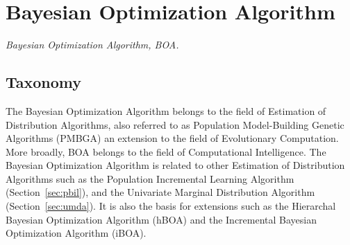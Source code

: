 

\section{Bayesian Optimization Algorithm} 
\label{sec:boa}

\emph{Bayesian Optimization Algorithm, BOA.}

\subsection{Taxonomy}
The Bayesian Optimization Algorithm belongs to the field of Estimation of Distribution Algorithms, also referred to as Population Model-Building Genetic Algorithms (PMBGA) an extension to the field of Evolutionary Computation. More broadly, BOA belongs to the field of Computational Intelligence.
The Bayesian Optimization Algorithm is related to other Estimation of Distribution Algorithms such as the Population Incremental Learning Algorithm (Section~\ref{sec:pbil}), and the Univariate Marginal Distribution Algorithm (Section~\ref{sec:umda}).
It is also the basis for extensions such as the Hierarchal Bayesian Optimization Algorithm (hBOA) and the Incremental Bayesian Optimization Algorithm (iBOA).

